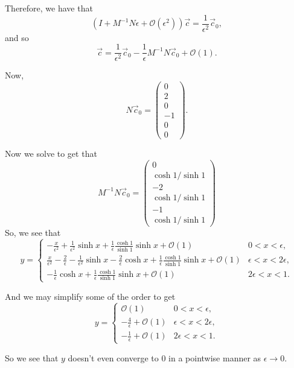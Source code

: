 \begin{example}
Therefore, we have that
\begin{equation}
(I + M^{-1}N \epsilon + \mathcal O(\epsilon^2))\vec c = \frac{1}{\epsilon^2}\vec c_0,
\end{equation}
and so
\begin{equation}
\vec c = \frac{1}{\epsilon^2}\vec c_0 -\frac{1}{\epsilon} M^{-1}N \vec c_0 + \mathcal O(1).
\end{equation}

Now, 
\begin{equation}
N \vec c_0 = \begin{pmatrix}
0\\
2\\
0\\
-1\\
0\\
0
\end{pmatrix}.
\end{equation}

Now we solve to get that
\begin{equation}
M^{-1} N \vec c_0 = 
\begin{pmatrix}
0\\
\cosh 1 /\sinh 1\\
-2\\
\cosh 1 / \sinh 1\\
-1 \\
\cosh 1 / \sinh 1
\end{pmatrix}
\end{equation}
So, we see that
\begin{equation}
y = \begin{cases}
-\frac{x}{\epsilon^2} + \frac{1}{\epsilon^2} \sinh x +\frac{1}{\epsilon}\frac{\cosh 1}{\sinh1} \sinh x + \mathcal O(1)& 0<x<\epsilon,\\
\frac{x}{\epsilon^2} - \frac{2}{\epsilon} - \frac{1}{\epsilon^2}\sinh x - \frac{2}{\epsilon} \cosh x +\frac{1}{\epsilon}\frac{\cosh 1}{\sinh1} \sinh x+ \mathcal O(1) & \epsilon < x < 2\epsilon,\\
-\frac{1}{\epsilon}\cosh x + \frac{1}{\epsilon}\frac{\cosh 1}{\sinh1} \sinh x + \mathcal O(1)& 2\epsilon < x < 1.
\end{cases}
\end{equation}

And we may simplify some of the order to get
\begin{equation}
y = \begin{cases}
\mathcal O(1)& 0<x<\epsilon,\\
- \frac{4}{\epsilon}  +\mathcal O(1) & \epsilon < x < 2\epsilon,\\
-\frac{1}{\epsilon}+ \mathcal O(1)& 2\epsilon < x < 1.
\end{cases}
\end{equation}

So we see that $y$ doesn't even converge to $0$ in a pointwise manner as $\epsilon \to 0$.
\end{example}